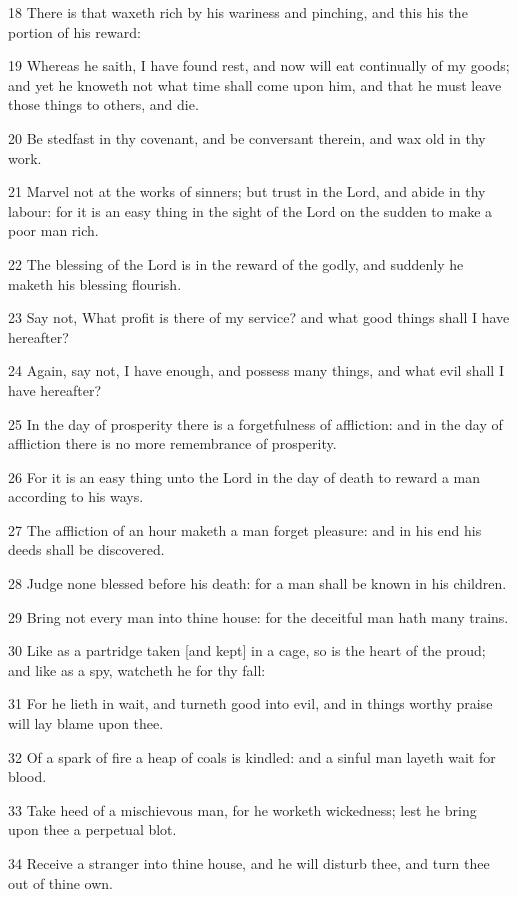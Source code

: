 \par 18 There is that waxeth rich by his wariness and pinching, and this his the portion of his reward:
\par 19 Whereas he saith, I have found rest, and now will eat continually of my goods; and yet he knoweth not what time shall come upon him, and that he must leave those things to others, and die.
\par 20 Be stedfast in thy covenant, and be conversant therein, and wax old in thy work.
\par 21 Marvel not at the works of sinners; but trust in the Lord, and abide in thy labour: for it is an easy thing in the sight of the Lord on the sudden to make a poor man rich.
\par 22 The blessing of the Lord is in the reward of the godly, and suddenly he maketh his blessing flourish.
\par 23 Say not, What profit is there of my service? and what good things shall I have hereafter?
\par 24 Again, say not, I have enough, and possess many things, and what evil shall I have hereafter?
\par 25 In the day of prosperity there is a forgetfulness of affliction: and in the day of affliction there is no more remembrance of prosperity.
\par 26 For it is an easy thing unto the Lord in the day of death to reward a man according to his ways.
\par 27 The affliction of an hour maketh a man forget pleasure: and in his end his deeds shall be discovered.
\par 28 Judge none blessed before his death: for a man shall be known in his children.
\par 29 Bring not every man into thine house: for the deceitful man hath many trains.
\par 30 Like as a partridge taken [and kept] in a cage, so is the heart of the proud; and like as a spy, watcheth he for thy fall:
\par 31 For he lieth in wait, and turneth good into evil, and in things worthy praise will lay blame upon thee.
\par 32 Of a spark of fire a heap of coals is kindled: and a sinful man layeth wait for blood.
\par 33 Take heed of a mischievous man, for he worketh wickedness; lest he bring upon thee a perpetual blot.
\par 34 Receive a stranger into thine house, and he will disturb thee, and turn thee out of thine own.

